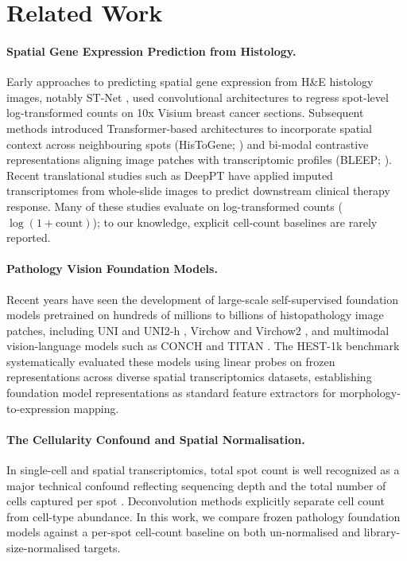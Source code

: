 \documentclass[10pt,twocolumn]{article}
\begin{document}
\section{Related Work}
\label{sec:related}

\paragraph{Spatial Gene Expression Prediction from Histology.}
Early approaches to predicting spatial gene expression from H\&E histology images, notably ST-Net \citep{he2020integrating}, used convolutional architectures to regress spot-level log-transformed counts on 10x Visium breast cancer sections. Subsequent methods introduced Transformer-based architectures to incorporate spatial context across neighbouring spots (HisToGene; \citep{pang2021leveraging}) and bi-modal contrastive representations aligning image patches with transcriptomic profiles (BLEEP; \citep{xie2023bleep}). Recent translational studies such as DeepPT \citep{hoang2024deeppt} have applied imputed transcriptomes from whole-slide images to predict downstream clinical therapy response. Many of these studies evaluate on log-transformed counts ($\log(1 + \text{count})$); to our knowledge, explicit cell-count baselines are rarely reported.

\paragraph{Pathology Vision Foundation Models.}
Recent years have seen the development of large-scale self-supervised foundation models pretrained on hundreds of millions to billions of histopathology image patches, including UNI and UNI2-h \citep{chen2024uni,chen2024uni2}, Virchow \citep{vorontsov2024virchow} and Virchow2 \citep{zimmermann2024virchow2}, and multimodal vision-language models such as CONCH \citep{lu2024conch} and TITAN \citep{ding2025titan}. The HEST-1k benchmark \citep{jaume2024hest} systematically evaluated these models using linear probes on frozen representations across diverse spatial transcriptomics datasets, establishing foundation model representations as standard feature extractors for morphology-to-expression mapping.

\paragraph{The Cellularity Confound and Spatial Normalisation.}
In single-cell and spatial transcriptomics, total spot count is well recognized as a major technical confound reflecting sequencing depth and the total number of cells captured per spot \citep{hafemeister2019normalization,kleshchevnikov2022cell2location}. Deconvolution methods explicitly separate cell count from cell-type abundance. In this work, we compare frozen pathology foundation models against a per-spot cell-count baseline on both un-normalised and library-size-normalised targets.
\end{document}
